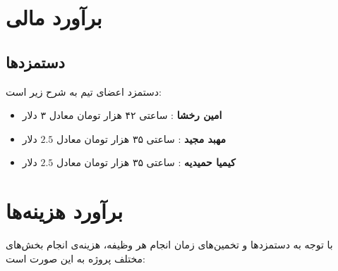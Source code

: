 \section{برآورد مالی}
\subsection{دستمزدها}
دستمزد اعضای تیم به شرح زیر است:
\begin{itemize}
	\item 
	\textbf{امین رخشا}
	: ساعتی ۴۲ هزار تومان معادل ۳ دلار
	\item 
	\textbf{مهبد مجید}
	: ساعتی ۳۵ هزار تومان معادل 
	$2.5$
	دلار
	\item 
	\textbf{کیمیا حمیدیه}
	: ساعتی ۳۵ هزار تومان معادل 
	$2.5$
	دلار
\end{itemize}

\section{برآورد هزینه‌ها}
با توجه به دستمزد‌ها و تخمین‌های زمان انجام هر وظیفه، هزینه‌‌ی انجام بخش‌های مختلف پروژه به این صورت است:

\begin{table}[H]
	\centering
\end{table}